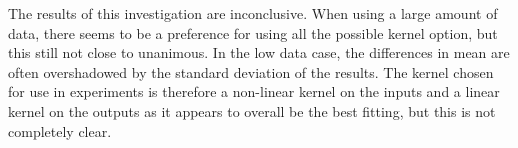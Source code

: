 The results of this investigation are inconclusive. When using a large amount of data, there seems to be a preference for using all the possible kernel option, but this still not close to unanimous. In the low data case, the differences in mean are often overshadowed by the standard deviation of the results. The kernel chosen for use in experiments is therefore a non-linear kernel on the inputs and a linear kernel on the outputs as it appears to overall be the best fitting, but this is not completely clear.

\afterpage{%
	\clearpage%
	\thispagestyle{empty}%
	\begin{landscape}
		

\end{landscape}}
